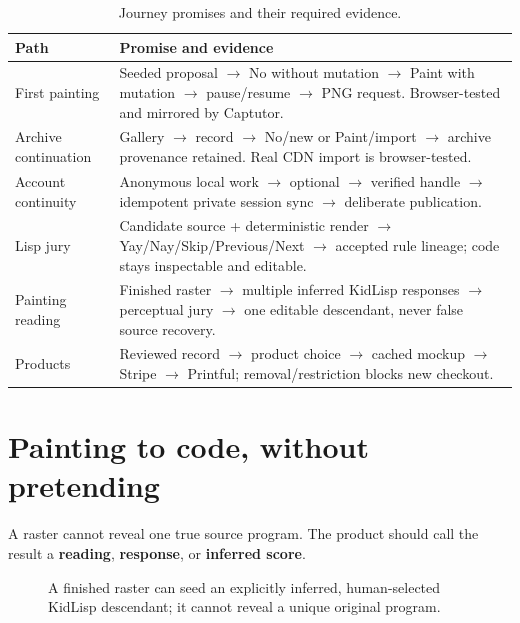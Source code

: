 \documentclass[10pt,letterpaper,twocolumn]{article}
\newcommand{\mono}[1]{\code{#1}}
\begin{document}
\begin{table}[t]
\caption{Journey promises and their required evidence.}
\begin{tabularx}{\textwidth}{@{}L{1.32in}Y@{}}
\toprule
\textbf{Path} & \textbf{Promise and evidence} \\
\midrule
First painting & Seeded proposal $\rightarrow$ No without mutation $\rightarrow$ Paint with mutation $\rightarrow$ pause/resume $\rightarrow$ PNG request. Browser-tested and mirrored by Captutor. \\
Archive continuation & Gallery $\rightarrow$ record $\rightarrow$ No/new or Paint/import $\rightarrow$ archive provenance retained. Real CDN import is browser-tested. \\
Account continuity & Anonymous local work $\rightarrow$ optional \mono{imnew} $\rightarrow$ verified handle $\rightarrow$ idempotent private session sync $\rightarrow$ deliberate publication. \\
Lisp jury & Candidate source + deterministic render $\rightarrow$ Yay/Nay/Skip/Previous/Next $\rightarrow$ accepted rule lineage; code stays inspectable and editable. \\
Painting reading & Finished raster $\rightarrow$ multiple inferred KidLisp responses $\rightarrow$ perceptual jury $\rightarrow$ one editable descendant, never false source recovery. \\
Products & Reviewed record $\rightarrow$ product choice $\rightarrow$ cached mockup $\rightarrow$ Stripe $\rightarrow$ Printful; removal/restriction blocks new checkout. \\
\bottomrule
\end{tabularx}
\end{table}

\section{Painting to code, without pretending}

A raster cannot reveal one true source program. The product should call the result a \textbf{reading}, \textbf{response}, or \textbf{inferred score}.

\begin{figure}[t]
\centering
{}
\caption{A finished raster can seed an explicitly inferred, human-selected KidLisp descendant; it cannot reveal a unique original program.}
\end{figure}
\end{document}

